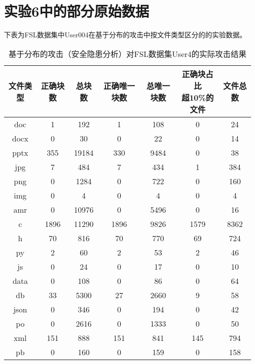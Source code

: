 \section*{实验6中的部分原始数据}
下表为FSL数据集中User004在基于分布的攻击中按文件类型区分的的实验数据。
\begin{table}[!htbp]
\centering
\caption{基于分布的攻击（安全隐患分析）对FSL数据集User4的实际攻击结果}
\label{tab:exp6-user4}
\begin{tabular}{@{}ccccccc@{}}
\toprule
 文件类型 & 正确块数 & 总块数   & 正确唯一块数 & 总唯一块数 & \tabincell{c}{正确块占比\\超10\%的文件} & 文件总数 \\ \midrule
doc  & 1      & 192     & 1       & 108    & 0               & 24   \\
docx & 0      & 30      & 0       & 22     & 0               & 14   \\
pptx & 355    & 19184   & 330     & 9484   & 0               & 38   \\
jpg  & 7      & 484     & 7       & 434    & 1               & 384  \\
png  & 0      & 1284    & 0       & 722    & 0               & 160  \\
img  & 0      & 4       & 0       & 4      & 0               & 4    \\
amr  & 0      & 10976   & 0       & 5496   & 0               & 16   \\
c    & 1896   & 11290   & 1896    & 9826   & 1579            & 8362 \\
h    & 70     & 816     & 70      & 770    & 69              & 724  \\
py   & 2      & 60      & 2       & 53     & 2               & 46   \\
js   & 0      & 24      & 0       & 17     & 0               & 10   \\
data & 0      & 108     & 0       & 86     & 0               & 64   \\
db   & 33     & 5300    & 27      & 2660   & 9               & 58   \\
json & 0      & 346     & 0       & 194    & 0               & 42   \\
po   & 0      & 2616    & 0       & 1333   & 0               & 50   \\
xml  & 151    & 888     & 151     & 841    & 145             & 794  \\
pb   & 0      & 160     & 0       & 159    & 0               & 158  \\

\end{tabular}
\end{table}

